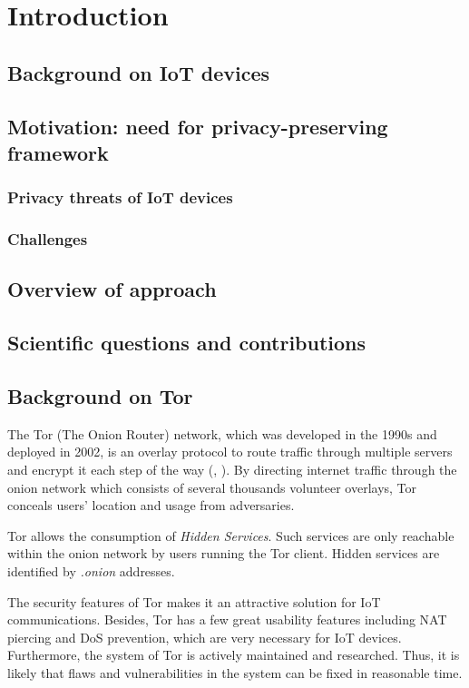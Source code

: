\chapter{Introduction}

\section{Background on IoT devices}

\section{Motivation: need for privacy-preserving framework}

\subsection{Privacy threats of IoT devices}

\subsection{Challenges}

\section{Overview of approach}

\section{Scientific questions and contributions}

\section{Background on Tor}
\label{sec:torbackground}
The Tor (The Onion Router) network, which was developed in the 1990s and deployed in 2002, is an overlay protocol to route traffic through multiple servers and encrypt it each step of the way (\cite{torproject}, \cite{chaabane2010digging}). By directing internet traffic through the onion network which consists of several thousands volunteer overlays, Tor conceals users' location and usage from adversaries.

Tor allows the consumption of \textit{Hidden Services}. Such services are only reachable within the onion network by users running the Tor client. Hidden services are identified by \textit{.onion} addresses.

The security features of Tor makes it an attractive solution for IoT communications. Besides, Tor has a few great usability features including NAT piercing and DoS prevention, which are very necessary for IoT devices. Furthermore, the system of Tor is actively maintained and researched. Thus, it is likely that flaws and vulnerabilities in the system can be fixed in reasonable time.